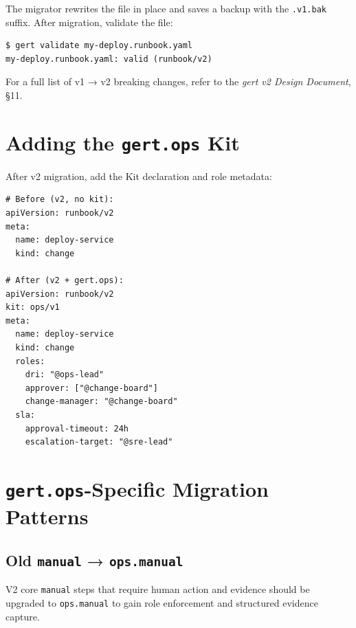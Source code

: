 The migrator rewrites the file in place and saves a backup with the \texttt{.v1.bak} suffix.
After migration, validate the file:

\begin{verbatim}
$ gert validate my-deploy.runbook.yaml
my-deploy.runbook.yaml: valid (runbook/v2)
\end{verbatim}

For a full list of v1 → v2 breaking changes, refer to the \emph{gert v2 Design Document}, §11.

\section{Adding the \texttt{gert.ops} Kit}
\label{sec:migration-add-kit}

After v2 migration, add the Kit declaration and role metadata:

\begin{verbatim}
# Before (v2, no kit):
apiVersion: runbook/v2
meta:
  name: deploy-service
  kind: change

# After (v2 + gert.ops):
apiVersion: runbook/v2
kit: ops/v1
meta:
  name: deploy-service
  kind: change
  roles:
    dri: "@ops-lead"
    approver: ["@change-board"]
    change-manager: "@change-board"
  sla:
    approval-timeout: 24h
    escalation-target: "@sre-lead"
\end{verbatim}

\section{\texttt{gert.ops}-Specific Migration Patterns}
\label{sec:migration-ops-patterns}

\subsection{Old \texttt{manual} → \texttt{ops.manual}}

V2 core \texttt{manual} steps that require human action and evidence should be upgraded to
\texttt{ops.manual} to gain role enforcement and structured evidence capture.

